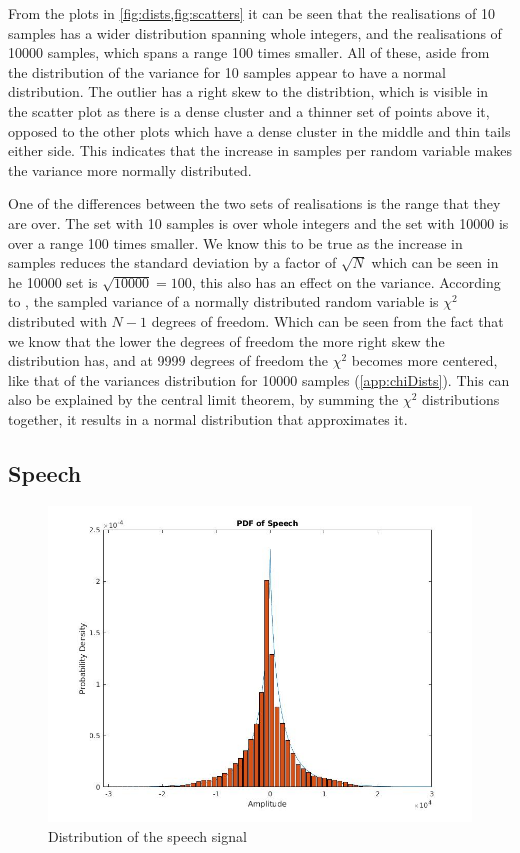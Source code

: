 \documentclass[a4paper, 12pt]{article}
\begin{document}
            From the plots in \cref{fig:dists,fig:scatters} it can be seen that the realisations of 10 samples has a wider distribution spanning whole integers, and the realisations of 10000 samples, which spans a range 100 times smaller. All of these, aside from the distribution of the variance for 10 samples appear to have a normal distribution. The outlier has a right skew to the distribtion, which is visible in the scatter plot as there is a dense cluster and a thinner set of points above it, opposed to the other plots which have a dense cluster in the middle and thin tails either side. This indicates that the increase in samples per random variable makes the variance more normally distributed.
            \par
            One of the differences between the two sets of realisations is the range that they are over. The set with 10 samples is over whole integers and the set with 10000 is over a range 100 times smaller. We know this to be true as the increase in samples reduces the standard deviation by a factor of $\sqrt{N}$ which can be seen in he 10000 set is $\sqrt{10000} = 100$, this also has an effect on the variance. According to \cite{sampling_dists_2020}, the sampled variance of a normally distributed random variable is $\chi^2$ distributed with $N-1$ degrees of freedom. Which can be seen from the fact that we know that the lower the degrees of freedom the more right skew the distribution has, and at 9999 degrees of freedom the $\chi^2$ becomes more centered, like that of the variances distribution for 10000 samples (\cref{app:chiDists}). This can also be explained by the central limit theorem, by summing the $\chi^2$ distributions together, it results in a normal distribution that approximates it.


        \subsection{Speech}

            \begin{figure}[!ht]
                \centering
                \includegraphics[width=\textwidth]{PDF_of_speech.jpg}
                \caption{Distribution of the speech signal}
                \label{fig:speech}
            \end{figure}
\end{document}
